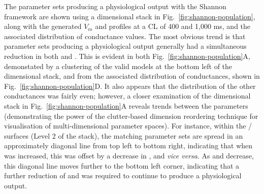 \documentclass[../thesis-main.tex]{subfiles}
\begin{document}
The parameter sets producing a physiological output with the Shannon framework are shown using a dimensional stack in Fig.~\ref{fig:shannon-population}, along with the generated $V_m$ and \cai{} profiles at a CL of 400 and 1,000 ms, and the associated distribution of conductance values. The most obvious trend is that parameter sets producing a physiological output generally had a simultaneous reduction in both \gca{} and \gkix{}. This is evident in both Fig.~\ref{fig:shannon-population}A, demonstated by a clustering of the valid models at the bottom left of the dimensional stack, and from the associated distribution of conductances, shown in Fig.~\ref{fig:shannon-population}D. It also appears that the distribution of the other conductances was fairly even; however, a closer examination of the dimensional stack in Fig.~\ref{fig:shannon-population}A reveals trends between the parameters (demonstrating the power of the clutter-based dimension reordering technique for visualisation of multi-dimensional parameter spaces). For instance, within the \gnak{}/\gkr{} surfaces (Level 2 of the stack), the matching parameter sets are spread in an approximately diagonal line from top left to bottom right, indicating that when \gnak{} was increased, this was offset by a decrease in \gkr{}, and \emph{vice versa}. As \gca{} and \gkix{} decrease, this diagonal line moves further to the bottom left corner, indicating that a further reduction of \gnak{} and \gkr{} was required to continue to produce a physiological output.
\end{document}
